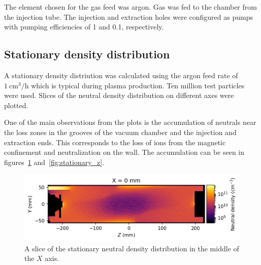 \documentclass[a4paper,twoside,12pt]{article}
\begin{document}
The element chosen for the gas feed was argon. Gas was fed to the chamber from the injection tube. The injection and extraction holes were configured as pumps with pumping efficiencies of 1 and 0.1, respectively.

\subsection{Stationary density distribution}
A stationary density distriution was calculated using the argon feed rate of $\SI{1}{\centi\metre\cubed\per\hour}$ which is typical during plasma production. Ten million test particles were used. Slices of the neutral density distribution on different axes were plotted.

One of the main observations from the plots is the accumulation of neutrals near the loss zones in the grooves of the vacuum chamber and the injection and extraction ends. This corresponds to the loss of ions from the magnetic confinement and neutralization on the wall. The accumulation can be seen in figures~\ref{fig:stationary_x} and~\ref{fig:stationary_z}.

\begin{figure}
    \centering
    \includegraphics[width=\textwidth]{images/stationary_x_middle.png}
    \caption{A slice of the stationary neutral density distribution in the middle of the $X$ axis.}
    \label{fig:stationary_x}
\end{figure}
\end{document}
